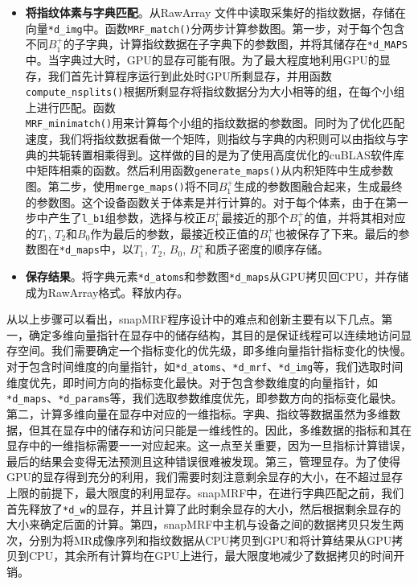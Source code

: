 \begin{itemize}
\item \textbf{将指纹体素与字典匹配}。从RawArray \cite{RawArray}文件中读取采集好的指纹数据，存储在向量\texttt{*d\_img}中。函数\texttt{MRF\_match()}分两步计算参数图。第一步，对于每个包含不同$B_1^+$的子字典，计算指纹数据在子字典下的参数图，并将其储存在\texttt{*d\_MAPS}中。当字典过大时，GPU的显存可能有限。为了最大程度地利用GPU的显存，我们首先计算程序运行到此处时GPU所剩显存，并用函数\texttt{compute\_nsplits()}根据所剩显存将指纹数据分为大小相等的组，在每个小组上进行匹配。函数\\ \texttt{MRF\_minimatch()}用来计算每个小组的指纹数据的参数图。同时为了优化匹配速度，我们将指纹数据看做一个矩阵，则指纹与字典的内积则可以由指纹与字典的共轭转置相乘得到。这样做的目的是为了使用高度优化的cuBLAS软件库中矩阵相乘的函数。然后利用函数\texttt{generate\_maps()}从内积矩阵中生成参数图。第二步，使用\texttt{merge\_maps()}将不同$B_1^+$生成的参数图融合起来，生成最终的参数图。这个设备函数关于体素是并行计算的。对于每个体素，由于在第一步中产生了\texttt{l\_b1}组参数，选择与校正$B_1^+$最接近的那个$B_1^+$的值，并将其相对应的$T_1$, $T_2$和$B_0$作为最后的参数，最接近校正值的$B_1^+$也被保存了下来。最后的参数图在\texttt{*d\_maps}中，以$T_1$, $T_2$, $B_0$, $B_1^+$和质子密度的顺序存储。

\item \textbf{保存结果}。将字典元素\texttt{*d\_atoms}和参数图\texttt{*d\_maps}从GPU拷贝回CPU，并存储成为RawArray格式。释放内存。

\end{itemize}

从以上步骤可以看出，snapMRF程序设计中的难点和创新主要有以下几点。第一，确定多维向量指针在显存中的储存结构，其目的是保证线程可以连续地访问显存空间。我们需要确定一个指标变化的优先级，即多维向量指针指标变化的快慢。对于包含时间维度的向量指针，如\texttt{*d\_atoms}、\texttt{*d\_mrf}、\texttt{*d\_img}等，我们选取时间维度优先，即时间方向的指标变化最快。对于包含参数维度的向量指针，如\texttt{*d\_maps}、\texttt{*d\_params}等，我们选取参数维度优先，即参数方向的指标变化最快。第二，计算多维向量在显存中对应的一维指标。字典、指纹等数据虽然为多维数据，但其在显存中的储存和访问只能是一维线性的。因此，多维数据的指标和其在显存中的一维指标需要一一对应起来。这一点至关重要，因为一旦指标计算错误，最后的结果会变得无法预测且这种错误很难被发现。第三，管理显存。为了使得GPU的显存得到充分的利用，我们需要时刻注意剩余显存的大小，在不超过显存上限的前提下，最大限度的利用显存。snapMRF中，在进行字典匹配之前，我们首先释放了\texttt{*d\_w}的显存，并且计算了此时剩余显存的大小，然后根据剩余显存的大小来确定后面的计算。第四，snapMRF中主机与设备之间的数据拷贝只发生两次，分别为将MR成像序列和指纹数据从CPU拷贝到GPU和将计算结果从GPU拷贝到CPU，其余所有计算均在GPU上进行，最大限度地减少了数据拷贝的时间开销。

